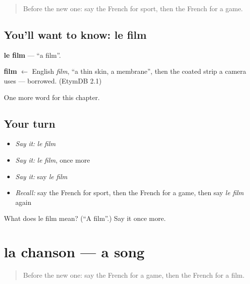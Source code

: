 \label{lesson:FR-C128-film}



\begin{quote}
Before the new one: say the French for sport, then the French for a game.
\end{quote}

\subsection*{You'll want to know: le film}
\textbf{le film} — \textquotedblleft{}a film\textquotedblright{}.

\begin{cousinweb}
\textbf{film} $\leftarrow$ English \emph{film}, \textquotedblleft{}a thin skin, a membrane\textquotedblright{}, then the coated strip a camera uses — borrowed. (EtymDB 2.1)
\end{cousinweb}

\begin{grammarlens}[title={What you've built}]
One more word for this chapter.
\end{grammarlens}

\subsection*{Your turn}
\begin{itemize}
\raggedright
  \item \emph{Say it:} \emph{le film}
  \item \emph{Say it:} \emph{le film}, once more
  \item \emph{Say it:} say \emph{le film}
  \item \emph{Recall:} say the French for sport, then the French for a game, then say \emph{le film} again
\end{itemize}

\begin{tcolorbox}[breakable,colback=teal!4,colframe=teal!35!black,title={Before you move on}]
What does le film mean? (\textquotedblleft{}A film\textquotedblright{}.) Say it once more.
\end{tcolorbox}
\section[la chanson]{la chanson — a song}

\label{lesson:FR-C128-chanson}



\begin{quote}
Before the new one: say the French for a game, then the French for a film.
\end{quote}

